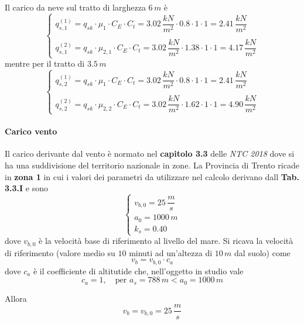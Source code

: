 Il carico da neve sul tratto di larghezza $6\,m$ è 
\begin{equation}
\label{eq:neve_1}
 \begin{cases}
  q_{s,1}^{(1)} = q_{sk}\cdot \mu_1 \cdot C_E\cdot C_t = 3.02\,\dfrac{kN}{m^2}\cdot 0.8\cdot 1\cdot 1 = 2.41\,\dfrac{kN}{m^2}\\\\
  q_{s,1}^{(2)} = q_{sk}\cdot \mu_{2,1} \cdot C_E\cdot C_t = 3.02\,\dfrac{kN}{m^2}\cdot 1.38\cdot 1\cdot 1 = 4.17\,\dfrac{kN}{m^2}
 \end{cases}
\end{equation}
mentre per il tratto di $3.5\,m$
\begin{equation}
 \label{eq:neve_2}
 \begin{cases}
  q_{s,2}^{(1)} = q_{sk}\cdot \mu_1 \cdot C_E\cdot C_t = 3.02\,\dfrac{kN}{m^2}\cdot 0.8\cdot 1\cdot 1 = 2.41\,\dfrac{kN}{m^2}\\\\
  q_{s,2}^{(2)} = q_{sk}\cdot \mu_{2,2}\cdot C_E\cdot C_t = 3.02\,\dfrac{kN}{m^2}\cdot 1.62\cdot 1\cdot 1 = 4.90\,\dfrac{kN}{m^2}
 \end{cases}
\end{equation}


\paragraph{Carico vento}

Il carico derivante dal vento è normato nel \textbf{capitolo 3.3} delle \emph{NTC 2018} dove si ha una suddivisione del territorio nazionale in zone. La Provincia di Trento ricade in \textbf{zona 1} in cui i valori dei parametri da utilizzare nel calcolo derivano dall \textbf{Tab. 3.3.I} e sono
\begin{equation*}
 \begin{cases}
    v_{b,0} = 25\,\dfrac{m}{s}\\
    a_0 = 1000\,m\\
    k_s = 0.40
 \end{cases}
\end{equation*}
dove $v_{b,0}$ è la velocità base di riferimento al livello del mare. Si ricava la velocità di riferimento (valore medio su $10$ minuti ad un'altezza di $10\,m$ dal suolo) come
\[
 v_b = v_{b,0}\cdot c_a
\]
dove $c_a$ è il coefficiente di altitutide che, nell'oggetto in studio vale
\[
 c_a = 1, \quad \text{per } a_s = 788\,m < a_0 = 1000\,m
\]

Allora
\[
 v_b = v_{b,0} = 25\,\dfrac{m}{s}
\]

